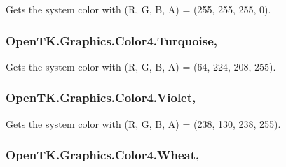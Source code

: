 Gets the system color with (R, G, B, A) = (255, 255, 255, 0). 

\hypertarget{struct_open_t_k_1_1_graphics_1_1_color4_a335ae3c1d6492511ac5192c53ef2bf17}{
\subsubsection[{Turquoise}]{ Open\-T\-K.\-Graphics.\-Color4.\-Turquoise\hspace{0.3cm}{\ttfamily [static]}, {\ttfamily [get]}}}\label{struct_open_t_k_1_1_graphics_1_1_color4_a335ae3c1d6492511ac5192c53ef2bf17}


Gets the system color with (R, G, B, A) = (64, 224, 208, 255). 

\hypertarget{struct_open_t_k_1_1_graphics_1_1_color4_a1fc602d69809ebd703b7ec19d6f580f1}{
\subsubsection[{Violet}]{ Open\-T\-K.\-Graphics.\-Color4.\-Violet\hspace{0.3cm}{\ttfamily [static]}, {\ttfamily [get]}}}\label{struct_open_t_k_1_1_graphics_1_1_color4_a1fc602d69809ebd703b7ec19d6f580f1}


Gets the system color with (R, G, B, A) = (238, 130, 238, 255). 

\hypertarget{struct_open_t_k_1_1_graphics_1_1_color4_a756b4cfcc381987c83f12fc5e937e7d2}{
\subsubsection[{Wheat}]{ Open\-T\-K.\-Graphics.\-Color4.\-Wheat\hspace{0.3cm}{\ttfamily [static]}, {\ttfamily [get]}}}\label{struct_open_t_k_1_1_graphics_1_1_color4_a756b4cfcc381987c83f12fc5e937e7d2}


